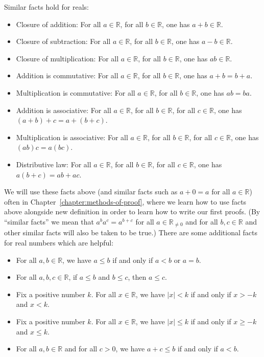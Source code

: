 \documentclass{book}
\theoremstyle{ekimcustom}
\begin{document}
Similar facts hold for reals:
\begin{itemize}
\item Closure of addition: For all $a \in \mathbb{R}$, for all $b \in \mathbb{R}$, one has $a+b \in \mathbb{R}$.
\item Closure of subtraction: For all $a \in \mathbb{R}$, for all $b \in \mathbb{R}$, one has $a-b \in \mathbb{R}$.
\item Closure of multiplication: For all $a \in \mathbb{R}$, for all $b \in \mathbb{R}$, one has $ab \in \mathbb{R}$.
\item Addition is commutative: For all $a \in \mathbb{R}$, for all $b \in \mathbb{R}$, one has $a+b=b+a$.
\item Multiplication is commutative: For all $a \in \mathbb{R}$, for all $b \in \mathbb{R}$, one has $ab=ba$.
\item Addition is associative: For all $a \in \mathbb{R}$, for all $b \in \mathbb{R}$, for all $c \in \mathbb{R}$, one has $(a+b)+c=a+(b+c)$.
\item Multiplication is associative: For all $a \in \mathbb{R}$, for all $b \in \mathbb{R}$, for all $c \in \mathbb{R}$, one has $(ab)c=a(bc)$.
\item Distributive law: For all $a \in \mathbb{R}$, for all $b \in \mathbb{R}$, for all $c \in \mathbb{R}$, one has $a(b+c)=ab+ac$.
\end{itemize}
We will use these facts above (and similar facts such as $a+0=a$ for all $a \in \mathbb{R}$) often in Chapter~\ref{chapter:methods-of-proof}, where we learn how to use facts above alongside new definition in order to learn how to write our first proofs. (By ``similar facts'' we mean that $a^ba^c=a^{b+c}$ for all $a \in \mathbb{R}_{\not=0}$ and for all $b,c \in \mathbb{R}$ and other similar facts will also be taken to be true.) There are some additional facts for real numbers which are helpful:
\begin{itemize}
\item For all $a,b \in \mathbb{R}$, we have $a \leq b$ if and only if $a < b$ or $a=b$.
\item For all $a,b,c \in \mathbb{R}$, if $a \leq b$ and $b \leq c$, then $a \leq c$.
\item Fix a positive number $k$. For all $x \in \mathbb{R}$, we have $|x|< k$ if and only if $x > -k$ and $x < k$.
\item Fix a positive number $k$. For all $x \in \mathbb{R}$, we have $|x|\leq k$ if and only if $x \geq -k$ and $x \leq k$.
\item For all $a,b \in \mathbb{R}$ and for all $c >0$, we have $a + c \leq b$ if and only if $a < b$.
\end{itemize}
\end{document}
